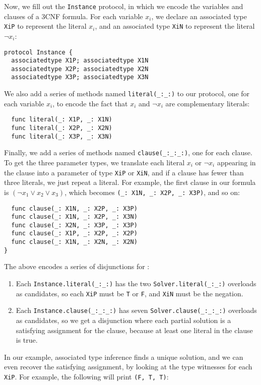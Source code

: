 \documentclass[../generics]{subfiles}
\begin{document}
Now, we fill out the \texttt{Instance} protocol, in which we encode the variables and clauses of a 3CNF formula. For each variable $x_i$, we declare an associated type \texttt{XiP} to represent the literal $x_i$, and an associated type \texttt{XiN} to represent the literal $\neg x_i$:
\begin{Verbatim}
protocol Instance {
  associatedtype X1P; associatedtype X1N
  associatedtype X2P; associatedtype X2N
  associatedtype X3P; associatedtype X3N
\end{Verbatim}
We also add a series of methods named \verb|literal(_:_:)| to our protocol, one for each variable $x_i$, to encode the fact that $x_i$ and $\neg x_i$ are complementary literals:
\begin{Verbatim}
  func literal(_: X1P, _: X1N)
  func literal(_: X2P, _: X2N)
  func literal(_: X3P, _: X3N)
\end{Verbatim}
Finally, we add a series of methods named \verb|clause(_:_:_:)|, one for each clause. To get the three parameter types, we translate each literal $x_i$ or $\neg x_i$ appearing in the clause into a parameter of type \texttt{XiP} or \texttt{XiN}, and if a clause has fewer than three literals, we just repeat a literal. For example, the first clause in our formula is $(\neg x_1 \vee x_2 \vee x_3)$, which becomes \verb|(_: X1N, _: X2P, _: X3P)|, and so on:
\begin{Verbatim}
  func clause(_: X1N, _: X2P, _: X3P)
  func clause(_: X1N, _: X2P, _: X3N)
  func clause(_: X2N, _: X3P, _: X3P)
  func clause(_: X1P, _: X2P, _: X2P)
  func clause(_: X1N, _: X2N, _: X2N)
}
\end{Verbatim}
The above encodes a series of disjunctions for :
\begin{enumerate}
\item Each \verb|Instance.literal(_:_:)| has the two \verb|Solver.literal(_:_:)| overloads as candidates, so each \texttt{XiP} must be \texttt{T} or \texttt{F}, and \texttt{XiN} must be the negation.
\item Each \verb|Instance.clause(_:_:_:)| has seven \verb|Solver.clause(_:_:_:)| overloads as candidates, so we get a disjunction where each partial solution is a satisfying assignment for the clause, because at least one literal in the clause is true.
\end{enumerate}
In our example, associated type inference finds a unique solution, and we can even recover the satisfying assignment, by looking at the type witnesses for each \texttt{XiP}. For example, the following will print \verb|(F, T, T)|:
\end{document}
